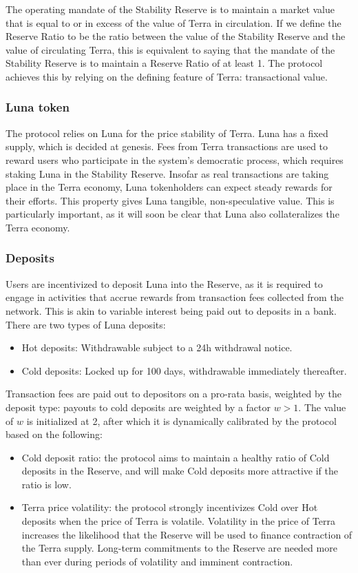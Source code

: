 \documentclass{article}
\begin{document}
The operating mandate of the Stability Reserve is to maintain a market value that is equal to or in excess of the value of Terra in circulation. If we define the Reserve Ratio to be the ratio between the value of the Stability Reserve and the value of circulating Terra, this is equivalent to saying that the mandate of the Stability Reserve is to maintain a Reserve Ratio of at least 1. The protocol achieves this by relying on the defining feature of Terra: transactional value. 

\subsubsection{Luna token}
The protocol relies on Luna for the price stability of Terra. Luna has a fixed supply, which is decided at genesis. Fees from Terra transactions are used to reward users who participate in the system's democratic process, which requires staking Luna in the Stability Reserve. Insofar as real transactions are taking place in the Terra economy, Luna tokenholders can expect steady rewards for their efforts. This property gives Luna tangible, non-speculative value. This is particularly important, as it will soon be clear that Luna also collateralizes the Terra economy.

\subsubsection{Deposits}
Users are incentivized to deposit Luna into the Reserve, as it is required to engage in activities that accrue rewards from transaction fees collected from the network. This is akin to variable interest being paid out to deposits in a bank. There are two types of Luna deposits:

\begin{itemize}
    \item Hot deposits: Withdrawable subject to a 24h withdrawal notice.
    \item Cold deposits: Locked up for 100 days, withdrawable immediately thereafter.
\end{itemize}

Transaction fees are paid out to depositors on a pro-rata basis, weighted by the deposit type: payouts to cold deposits are weighted by a factor $w > 1$. The value of $w$ is initialized at 2, after which it is dynamically calibrated by the protocol based on the following:

\begin{itemize}
    \item Cold deposit ratio: the protocol aims to maintain a healthy ratio of Cold deposits in the Reserve, and will make Cold deposits more attractive if the ratio is low.
    \item Terra price volatility: the protocol strongly incentivizes Cold over Hot deposits when the price of Terra is volatile. Volatility in the price of Terra increases the likelihood that the Reserve will be used to finance contraction of the Terra supply. Long-term commitments to the Reserve are needed more than ever during periods of volatility and imminent contraction.
\end{itemize}
\end{document}
